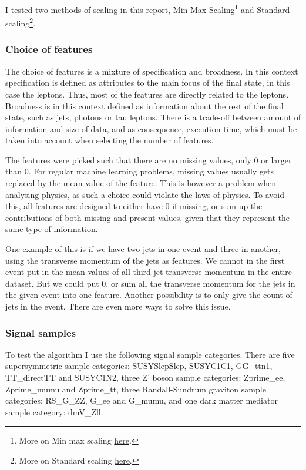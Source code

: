\documentclass[ reprint, amsmath,amssymb, aps, nofootinbib]{revtex4-2}
\begin{document}
I tested two methods of scaling in this report, Min Max Scaling\footnote{More on Min max scaling \href{https://scikit-learn.org/stable/modules/generated/sklearn.preprocessing.MinMaxScaler.html}{here}.} and Standard scaling\footnote{More on Standard scaling \href{https://scikit-learn.org/stable/modules/generated/sklearn.preprocessing.StandardScaler.html}{here}.}\cite{scikit-learn}.

\subsubsection{Choice of features}
The choice of features is a mixture of specification and broadness. In this context specification is defined as attributes to the main focus of the final state, in this case the leptons. Thus, most of the features are directly related to the leptons. Broadness is in this context defined as information about the rest of the final state, such as jets, photons or tau leptons. There is a trade-off between amount of information and size of data, and as consequence, execution time, which must be taken into account when selecting the number of features.\par 
The features were picked such that there are no missing values, only 0 or larger than 0. For regular machine learning problems, missing values usually gets replaced by the mean value of the feature. This is however a problem when analysing physics, as such a choice could violate the laws of physics. To avoid this, all features are designed to either have 0 if missing, or sum up the contributions of both missing and present values, given that they represent the same type of information. \par 
One example of this is if we have two jets in one event and three in another, using the transverse momentum of the jets as features. We cannot in the first event put in the mean values of all third jet-transverse momentum in the entire dataset. 
But we could put 0, or sum all the transverse momentum for the jets in the given event into one feature. Another possibility is to only give the count of jets in the event. There are even more ways to solve this issue. 


\subsubsection{Signal samples}
To test the algorithm I use the following signal sample categories. There are five supersymmetric sample categories: SUSYSlepSlep, SUSYC1C1, GG\_ttn1, TT\_directTT and SUSYC1N2\cite{DeSanto:2644352}, three Z' boson sample categories: Zprime\_ee, Zprime\_mumu and Zprime\_tt\cite{https://doi.org/10.48550/arxiv.1308.5874}, three Randall-Sundrum graviton sample categories: RS\_G\_ZZ, G\_ee and G\_mumu\cite{Randall_1999}, and one dark matter mediator sample category: dmV\_Zll. 
\end{document}
